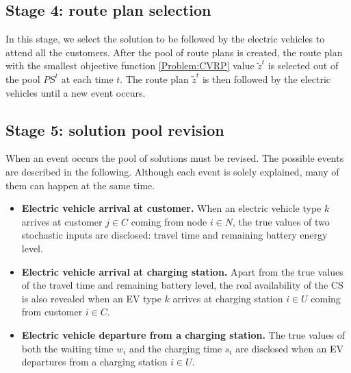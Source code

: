 \documentclass[11pt]{article}
\begin{document}
\subsection{Stage 4: route plan selection}
\label{section:stage4}
In this stage, we select the solution to be followed by the electric vehicles to attend all the customers. After the pool of route plans is created, the route plan with the smallest objective function \eqref{Problem:CVRP} value $\tilde{z}^t$ is selected out of the pool $PS^t$ at each time $t$. The route plan $\tilde{z}^t$ is then followed by the electric vehicles until a new event occurs.

\subsection{Stage 5: solution pool revision}
When an event occurs the pool of solutions must be revised. The possible events are described in the following. Although each event is solely explained, many of them can happen at the same time. 

\begin{itemize}
\item \textbf{Electric vehicle arrival at customer.} 
When an electric vehicle type $k$ arrives at customer $j \in C$ coming from node $i \in N$, the true values of two stochastic inputs are disclosed: travel time and remaining battery energy level.
\item \textbf{Electric vehicle arrival at charging station.}
Apart from the true values of the travel time and remaining battery level, the real availability of the CS is also revealed when an EV type $k$ arrives at charging station $i \in U$ coming from customer $i \in C$. 
\item \textbf{Electric vehicle departure from a charging station.}
The true values of both the waiting time $w_i$ and the charging time $s_i$ are disclosed when an EV departures from a charging station $i \in U$. 
\end{itemize}
\end{document}

